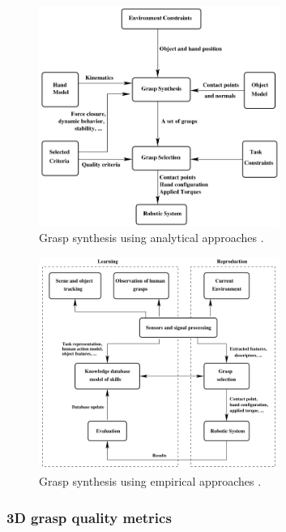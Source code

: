 \documentclass[12pt]{article}
\begin{document}
    \begin{figure}[H]
    	\centering
    	\includegraphics[width=0.7\textwidth]{sahbani12-analytic_grasp_strategy}
    	\caption{Grasp synthesis using analytical approaches \cite{Sahbani2012}.}
    	\label{fig:analytic_grasp}
    \end{figure}

	\begin{figure}[H]
		\centering
		\includegraphics[width=0.7\textwidth]{sahbani12-empirical_grasp_strategy}
		\caption{Grasp synthesis using empirical approaches \cite{Sahbani2012}.}
		\label{fig:empirical_grasp}
	\end{figure}

	\subsubsection{3D grasp quality metrics}
\end{document}

